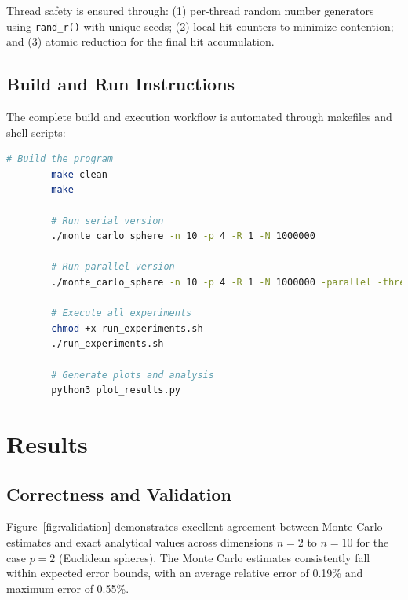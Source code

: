 \documentclass[11pt,a4paper]{article}
\begin{document}
	Thread safety is ensured through: (1) per-thread random number generators using \texttt{rand\_r()} with unique seeds; (2) local hit counters to minimize contention; and (3) atomic reduction for the final hit accumulation.
	
	\subsection{Build and Run Instructions}
	
	The complete build and execution workflow is automated through makefiles and shell scripts:
	
	\begin{lstlisting}[language=bash,caption={Build and run commands.},label={lst:commands}]
		# Build the program
		make clean
		make
		
		# Run serial version
		./monte_carlo_sphere -n 10 -p 4 -R 1 -N 1000000
		
		# Run parallel version
		./monte_carlo_sphere -n 10 -p 4 -R 1 -N 1000000 -parallel -threads 4
		
		# Execute all experiments
		chmod +x run_experiments.sh
		./run_experiments.sh
		
		# Generate plots and analysis
		python3 plot_results.py
	\end{lstlisting}
	
	\section{Results}
	
	\subsection{Correctness and Validation}
	
	Figure~\ref{fig:validation} demonstrates excellent agreement between Monte Carlo estimates and exact analytical values across dimensions $n = 2$ to $n = 10$ for the case $p = 2$ (Euclidean spheres). The Monte Carlo estimates consistently fall within expected error bounds, with an average relative error of 0.19\% and maximum error of 0.55\%.
	
\end{document}
